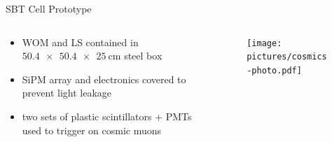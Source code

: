 \documentclass[aspectratio=169]{beamer}
\begin{document}
	
	
	
	
	
	\begin{frame}{SBT Cell Prototype}
		\begin{columns}
			
			\begin{column}{0.5\textwidth}
				\begin{itemize}
					\item WOM and LS contained in $\SI{50.4 x 50.4 x 25}{\centi\meter}$ steel box
					\item SiPM array and electronics covered to prevent light leakage
					\item two sets of plastic scintillators + PMTs used to trigger on cosmic muons
				\end{itemize}
			\end{column}
		
			\begin{column}{0.5\textwidth}
					\begin{figure}
						\centering
						\texttt{[image: pictures/cosmics-photo.pdf]}
					\end{figure}
			\end{column}
			
			
			
			
			
		\end{columns}
	\end{frame}
\end{document}
